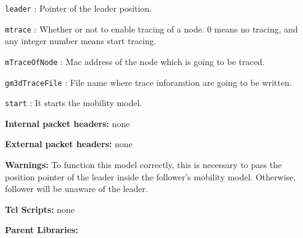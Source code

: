 \begin{description}
\begin{description}
      \item {\tt leader} : Pointer of the leader position.
      \item {\tt mtrace} : Whether or not to enable tracing of a node. $0$ means no tracing, and any integer number means start tracing.
      \item {\tt mTraceOfNode} : Mac address of the node which is going to be traced.
      \item {\tt gm3dTraceFile} : File name where trace inforamtion are going to be written.
      \item {\tt start} : It starts the mobility model.
    \end{description}
   \item {\bf Internal packet headers:} none
   \item {\bf External packet headers:} none
   \item {\bf Warnings:} To function this model correctly, this is necessary to pass the position pointer of the leader inside the follower's mobility model. Otherwise, follower will be unaware of the leader.
   \item {\bf Tcl Scripts:} none
   \item {\bf Parent Libraries:}  
\end{description}
